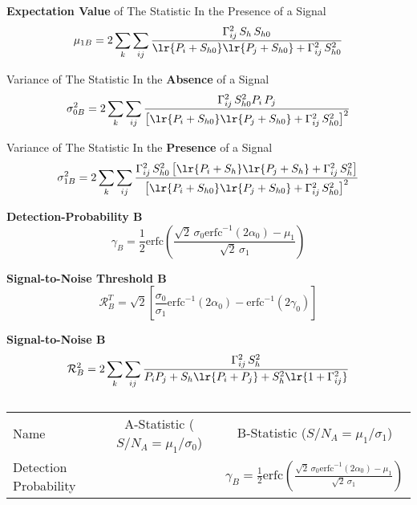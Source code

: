 \documentclass[10pt, oneside, onecolumn]{article}   	%
\newcommand\erfc[1]{\mathrm{erfc}\left(#1\right)}
\newcommand\erfcinv[1]{\mathrm{erfc}^{-1}\left(#1\right)}
\newcommand\snr{\mathcal{R}}
\newcommand\pulsarsum{\sum_k \sum_{ij}}
\begin{document}
    \noindent \textbf{Expectation Value} of The Statistic In the Presence of a Signal
    \begin{equation}
    \mu_{1B} = 2 \pulsarsum \frac{\Gamma_{ij}^2 \, S_h \, S_{h0}}{\lr{P_i + S_{h0}} \lr{P_j + S_{h0}} + \Gamma_{ij}^2 \, S_{h0}^2}
    \end{equation}

    \noindent Variance of The Statistic In the \textbf{Absence} of a Signal
    \begin{equation}
    \sigma_{0B}^2 = 2 \pulsarsum \frac{\Gamma_{ij}^2 \, S_{h0}^2 P_i \, P_j}{\left[{\lr{P_i + S_{h0}} \lr{P_j + S_{h0}} + \Gamma_{ij}^2 \, S_{h0}^2}\right]^2}
    \end{equation}

    \noindent Variance of The Statistic In the \textbf{Presence} of a Signal
    \begin{equation}
    \sigma_{1B}^2 = 2 \pulsarsum \frac{\Gamma_{ij}^2 \, S_{h0}^2 \left[ \lr{P_i + S_h} \lr{P_j + S_h} + \Gamma_{ij}^2 \, S_h^2\right]}{\left[{\lr{P_i + S_{h0}} \lr{P_j + S_{h0}} + \Gamma_{ij}^2 \, S_{h0}^2}\right]^2}
    \end{equation}

    \noindent \textbf{Detection-Probability B}
    \begin{equation}
    \gamma_B = \frac{1}{2} \erfc{ \frac{\sqrt{2} \, \sigma_0 \erfcinv{2\alpha_0} - \mu_1}{\sqrt{2} \, \sigma_1} }
    \end{equation}

    \noindent \textbf{Signal-to-Noise Threshold B}
    \begin{equation}
    \label{eq:snr_thresh_b}
    \snr_B^T = \sqrt{2} \left[ \frac{\sigma_0}{\sigma_1} \erfcinv{2\alpha_0} - \erfcinv{2\gamma_0} \right]
    \end{equation}

    \noindent \textbf{Signal-to-Noise B}
    \begin{equation}
    \label{eq:snr_b}
    \snr_B^2 = 2 \pulsarsum \frac{\Gamma_{ij}^2 \, S_h^2}{P_i P_j + S_h\lr{P_i + P_j} + S_h^2\lr{1 + \Gamma_{ij}^2}}
    \end{equation}


    \begin{table*}\centering
    \renewcommand{\arraystretch}{1.2}
    \setlength{\tabcolsep}{4pt}
    \begin{tabular}{@{}lcc@{}}
    Name 					& A-Statistic ($S/N_A = \mu_1 / \sigma_0$)		& B-Statistic ($S/N_A = \mu_1 / \sigma_1$)		\\ %
    Detection Probability	&												& $\gamma_B = \frac{1}{2} \erfc{ \frac{\sqrt{2} \, \sigma_0 \erfcinv{2\alpha_0} - \mu_1}{\sqrt{2} \, \sigma_1} }$												\\
    \end{tabular}
    \caption{}
    \label{tab:}
    \end{table*}
\end{document}
